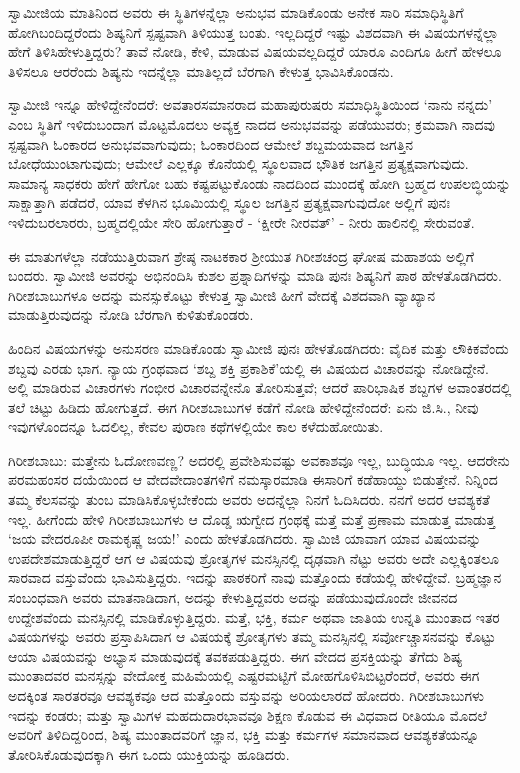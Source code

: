 ಸ್ವಾಮೀಜಿಯ ಮಾತಿನಿಂದ ಅವರು ಈ ಸ್ಥಿತಿಗಳನ್ನೆಲ್ಲಾ ಅನುಭವ ಮಾಡಿಕೊಂಡು ಅನೇಕ ಸಾರಿ ಸಮಾಧಿಸ್ಥಿತಿಗೆ ಹೋಗಿಬಂದಿದ್ದರೆಂದು ಶಿಷ್ಯನಿಗೆ ಸ್ಪಷ್ಟವಾಗಿ ತಿಳಿಯುತ್ತ ಬಂತು. ಇಲ್ಲದಿದ್ದರೆ ಇಷ್ಟು ವಿಶದವಾಗಿ ಈ ವಿಷಯಗಳನ್ನೆಲ್ಲಾ ಹೇಗೆ ತಿಳಿಸಿಹೇಳುತ್ತಿದ್ದರು? ತಾವೆ ನೋಡಿ, ಕೇಳಿ, ಮಾಡುವ ವಿಷಯವಲ್ಲದಿದ್ದರೆ ಯಾರೂ ಎಂದಿಗೂ ಹೀಗೆ ಹೇಳಲೂ ತಿಳಿಸಲೂ ಆರರೆಂದು ಶಿಷ್ಯನು ಇದನ್ನೆಲ್ಲಾ ಮಾತಿಲ್ಲದೆ ಬೆರಗಾಗಿ ಕೇಳುತ್ತ ಭಾವಿಸಿಕೊಂಡನು.

ಸ್ವಾಮೀಜಿ ಇನ್ನೂ ಹೇಳಿದ್ದೇನೆಂದರೆ: ಅವತಾರಸಮಾನರಾದ ಮಹಾಪುರುಷರು ಸಮಾಧಿಸ್ಥಿತಿಯಿಂದ ‘ನಾನು ನನ್ನದು’ ಎಂಬ ಸ್ಥಿತಿಗೆ ಇಳಿದುಬಂದಾಗ ಮೊಟ್ಟಮೊದಲು ಅವ್ಯಕ್ತ ನಾದದ ಅನುಭವವನ್ನು ಪಡೆಯುವರು; ಕ್ರಮವಾಗಿ ನಾದವು ಸ್ಪಷ್ಟವಾಗಿ ಓಂಕಾರದ ಅನುಭವವಾಗುವುದು; ಓಂಕಾರದಿಂದ ಆಮೇಲೆ ಶಬ್ದಮಯವಾದ ಜಗತ್ತಿನ ಬೋಧೆಯುಂಟಾಗುವುದು; ಆಮೇಲೆ ಎಲ್ಲಕ್ಕೂ ಕೊನೆಯಲ್ಲಿ ಸ್ಥೂಲವಾದ ಭೌತಿಕ ಜಗತ್ತಿನ ಪ್ರತ್ಯಕ್ಷವಾಗುವುದು. ಸಾಮಾನ್ಯ ಸಾಧಕರು ಹೇಗೆ ಹೇಗೋ ಬಹು ಕಷ್ಟಪಟ್ಟುಕೊಂಡು ನಾದದಿಂದ ಮುಂದಕ್ಕೆ ಹೋಗಿ ಬ್ರಹ್ಮದ ಉಪಲಬ್ಧಿಯನ್ನು ಸಾಕ್ಷಾತ್ತಾಗಿ ಪಡೆದರೆ, ಯಾವ ಕೆಳಗಿನ ಭೂಮಿಯಲ್ಲಿ ಸ್ಥೂಲ ಜಗತ್ತಿನ ಪ್ರತ್ಯಕ್ಷವಾಗುವುದೋ ಅಲ್ಲಿಗೆ ಪುನಃ ಇಳಿದುಬರಲಾರರು, ಬ್ರಹ್ಮದಲ್ಲಿಯೇ ಸೇರಿ ಹೋಗುತ್ತಾರೆ - ‘ಕ್ಷೀರೇ ನೀರವತ್’ - ನೀರು ಹಾಲಿನಲ್ಲಿ ಸೇರುವಂತೆ.

ಈ ಮಾತುಗಳೆಲ್ಲಾ ನಡೆಯುತ್ತಿರುವಾಗ ಶ್ರೇಷ್ಠ ನಾಟಕಕಾರ ಶ‍್ರೀಯುತ ಗಿರೀಶಚಂದ್ರ ಘೋಷ ಮಹಾಶಯ ಅಲ್ಲಿಗೆ ಬಂದರು. ಸ್ವಾಮೀಜಿ ಅವರನ್ನು ಅಭಿನಂದಿಸಿ ಕುಶಲ ಪ್ರಶ್ನಾದಿಗಳನ್ನು ಮಾಡಿ ಪುನಃ ಶಿಷ್ಯನಿಗೆ ಪಾಠ ಹೇಳತೊಡಗಿದರು. ಗಿರೀಶಬಾಬುಗಳೂ ಅದನ್ನು ಮನಸ್ಸುಕೊಟ್ಟು ಕೇಳುತ್ತ ಸ್ವಾಮೀಜಿ ಹೀಗೆ ವೇದಕ್ಕೆ ವಿಶದವಾಗಿ ವ್ಯಾಖ್ಯಾನ ಮಾಡುತ್ತಿರುವುದನ್ನು ನೋಡಿ ಬೆರಗಾಗಿ ಕುಳಿತುಕೊಂಡರು.

ಹಿಂದಿನ ವಿಷಯಗಳನ್ನು ಅನುಸರಣ ಮಾಡಿಕೊಂಡು ಸ್ವಾಮೀಜಿ ಪುನಃ ಹೇಳತೊಡಗಿದರು: ವೈದಿಕ ಮತ್ತು ಲೌಕಿಕವೆಂದು ಶಬ್ದವು ಎರಡು ಭಾಗ. ನ್ಯಾಯ ಗ್ರಂಥವಾದ ‘ಶಬ್ದ ಶಕ್ತಿ ಪ್ರಕಾಶಿಕೆ’ಯಲ್ಲಿ ಈ ವಿಷಯದ ವಿಚಾರವನ್ನು ನೋಡಿದ್ದೇನೆ. ಅಲ್ಲಿ ಮಾಡಿರುವ ವಿಚಾರಗಳು ಗಂಭೀರ ವಿಚಾರವನ್ನೇನೊ ತೋರಿಸುತ್ತವೆ; ಆದರೆ ಪಾರಿಭಾಷಿಕ ಶಬ್ದಗಳ ಅವಾಂತರದಲ್ಲಿ ತಲೆ ಚಿಟ್ಟು ಹಿಡಿದು ಹೋಗುತ್ತದೆ. ಈಗ ಗಿರೀಶಬಾಬುಗಳ ಕಡೆಗೆ ನೋಡಿ ಹೇಳಿದ್ದೇನೆಂದರೆ: ಏನು ಜಿ.ಸಿ., ನೀವು ಇವುಗಳೊಂದನ್ನೂ ಓದಲಿಲ್ಲ, ಕೇವಲ ಪುರಾಣ ಕಥೆಗಳಲ್ಲಿಯೇ ಕಾಲ ಕಳೆದುಹೋಯಿತು.

ಗಿರೀಶಬಾಬು: ಮತ್ತೇನು ಓದೋಣವಣ್ಣ? ಅದರಲ್ಲಿ ಪ್ರವೇಶಿಸುವಷ್ಟು ಅವಕಾಶವೂ ಇಲ್ಲ, ಬುದ್ಧಿಯೂ ಇಲ್ಲ. ಆದರೇನು ಪರಮಹಂಸರ ದಯೆಯಿಂದ ಆ ವೇದವೇದಾಂತಗಳಿಗೆ ನಮಸ್ಕಾರಮಾಡಿ ಈಸಾರಿಗೆ ಕಡೆಹಾಯ್ದು ಬಿಡುತ್ತೇನೆ. ನಿನ್ನಿಂದ ತಮ್ಮ ಕೆಲಸವನ್ನು ತುಂಬ ಮಾಡಿಸಿಕೊಳ್ಳಬೇಕೆಂದು ಅವರು ಅದನ್ನೆಲ್ಲಾ ನಿನಗೆ ಓದಿಸಿದರು. ನನಗೆ ಅದರ ಆವಶ್ಯಕತೆ ಇಲ್ಲ. ಹೀಗೆಂದು ಹೇಳಿ ಗಿರೀಶಬಾಬುಗಳು ಆ ದೊಡ್ಡ ಋಗ್ವೇದ ಗ್ರಂಥಕ್ಕೆ ಮತ್ತೆ ಮತ್ತೆ ಪ್ರಣಾಮ ಮಾಡುತ್ತ ಮಾಡುತ್ತ ‘ಜಯ ವೇದರೂಪೀ ರಾಮಕೃಷ್ಣ ಜಯ!’ ಎಂದು ಹೇಳತೊಡಗಿದರು. ಸ್ವಾಮಿಜಿ ಯಾವಾಗ ಯಾವ ವಿಷಯವನ್ನು ಉಪದೇಶಮಾಡುತ್ತಿದ್ದರೆ ಆಗ ಆ ವಿಷಯವು ಶ್ರೋತೃಗಳ ಮನಸ್ಸಿನಲ್ಲಿ ದೃಢವಾಗಿ ನೆಟ್ಟು ಅವರು ಅದೇ ಎಲ್ಲಕ್ಕಿಂತಲೂ ಸಾರವಾದ ವಸ್ತುವೆಂದು ಭಾವಿಸುತ್ತಿದ್ದರು. ಇದನ್ನು ಪಾಠಕರಿಗೆ ನಾವು ಮತ್ತೊಂದು ಕಡೆಯಲ್ಲಿ ಹೇಳಿದ್ದೇವೆ. ಬ್ರಹ್ಮಜ್ಞಾನ ಸಂಬಂಧವಾಗಿ ಅವರು ಮಾತನಾಡಿದಾಗ, ಅದನ್ನು ಕೇಳುತ್ತಿದ್ದವರು ಅದನ್ನು ಪಡೆಯುವುದೊಂದೇ ಜೀವನದ ಉದ್ದೇಶವೆಂದು ಮನಸ್ಸಿನಲ್ಲಿ ಮಾಡಿಕೊಳ್ಳುತ್ತಿದ್ದರು. ಮತ್ತೆ, ಭಕ್ತಿ, ಕರ್ಮ ಅಥವಾ ಜಾತಿಯ ಉನ್ನತಿ ಮುಂತಾದ ಇತರ ವಿಷಯಗಳನ್ನು ಅವರು ಪ್ರಸ್ತಾಪಿಸಿದಾಗ ಆ ವಿಷಯಕ್ಕೆ ಶ್ರೋತೃಗಳು ತಮ್ಮ ಮನಸ್ಸಿನಲ್ಲಿ ಸರ್ವೋಚ್ಚಾಸನವನ್ನು ಕೊಟ್ಟು ಆಯಾ ವಿಷಯವನ್ನು ಅಭ್ಯಾಸ ಮಾಡುವುದಕ್ಕೆ ತವಕಪಡುತ್ತಿದ್ದರು. ಈಗ ವೇದದ ಪ್ರಸಕ್ತಿಯನ್ನು ತೆಗೆದು ಶಿಷ್ಯ ಮುಂತಾದವರ ಮನಸ್ಸನ್ನು ವೇದೋಕ್ತ ಮಹಿಮೆಯಲ್ಲಿ ಎಷ್ಟರಮಟ್ಟಿಗೆ ಮೋಹಗೊಳಿಸಿಬಿಟ್ಟರೆಂದರೆ, ಅವರು ಈಗ ಅದಕ್ಕಿಂತ ಸಾರತರವೂ ಆವಶ್ಯಕವೂ ಆದ ಮತ್ತೊಂದು ವಸ್ತುವನ್ನು ಅರಿಯಲಾರದೆ ಹೋದರು. ಗಿರೀಶಬಾಬುಗಳು ಇದನ್ನು ಕಂಡರು; ಮತ್ತು ಸ್ವಾಮಿಗಳ ಮಹದುದಾರಭಾವವೂ ಶಿಕ್ಷಣ ಕೊಡುವ ಈ ವಿಧವಾದ ರೀತಿಯೂ ಮೊದಲೆ ಅವರಿಗೆ ತಿಳಿದಿದ್ದರಿಂದ, ಶಿಷ್ಯ ಮುಂತಾದವರಿಗೆ ಜ್ಞಾನ, ಭಕ್ತಿ ಮತ್ತು ಕರ್ಮಗಳ ಸಮಾನವಾದ ಆವಶ್ಯಕತೆಯನ್ನೂ ತೋರಿಸಿಕೊಡುವುದಕ್ಕಾಗಿ ಈಗ ಒಂದು ಯುಕ್ತಿಯನ್ನು ಹೂಡಿದರು.

